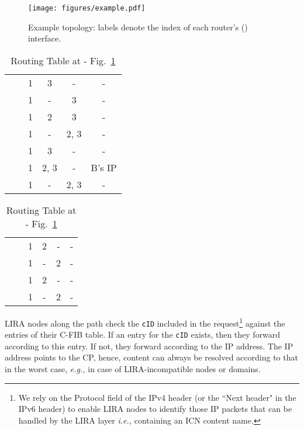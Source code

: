 \documentclass{sig-alternate}
\newcommand*\circled[1]{\tikz[baseline=(char.base)]{
            \node[shape=circle,draw,inner sep=2pt] (char) {#1};}}
\newcommand{\ie}{{\em i.e.,\/ }}
\newcommand{\eg}{{\em e.g.,\/ }}
\begin{document}
\begin{figure} [!t]
\begin{center}
	\texttt{[image: figures/example.pdf]}\vspace{-0.3cm}
	\caption{Example topology: labels  denote the index  of each router's () interface.}
	\label{example}    
\end{center}
\end{figure}

\begin{table}[!t]
\begin{center}

\begin{tabular}{l |*{5}{c}}
              &  &  &  &  &  \\
\hline
	 &  & 1 & 3 & - & -  \\
          &  & 1 & - & 3 & -   \\
     	  &  & 1 & 2 & 3 & -  \\
     	  &  & 1 & - & 2, 3 & -  \\
\hline
\hline
     	  &  & 1 & 3 & - & -  \\
     	  &  & 1 & 2, 3 & - & B's IP  \\
     &  & 1 & - & 2, 3 & -  \\
\end{tabular}
\caption{Routing Table at  - Fig.~\ref{example}}
\label{table:r1routing-table}
\end{center}
\end{table}

\begin{table}[!t]
\begin{center}

\begin{tabular}{l |*{5}{c}}
              &  &  &  &  &  \\
\hline
	 &  & 1 & 2 & - & -  \\
          &  & 1 & - & 2 & -  \\
\hline
\hline
          &  & 1 & 2 & - & -  \\
     &  & 1 & - & 2 & -  \\
\end{tabular}
\caption{Routing Table at  - Fig.~\ref{example}}
\label{table:r2routing-table}
\end{center}
\end{table}




\circled{6} LIRA nodes along the path check the \texttt{cID} included in the request\footnote{We rely on the Protocol field of the IPv4 header (or the ``Next header" in the IPv6 header) to enable LIRA nodes to identify those IP packets that can be handled by the LIRA layer \ie containing an ICN content name.} against the entries of their C-FIB table. If an entry for the \texttt{cID} exists, then they forward according to this entry. If not, they forward according to the IP address. The IP address points to the CP, hence, content can always be resolved according to that in the worst case, \eg in case of LIRA-incompatible nodes or domains.
\end{document}
